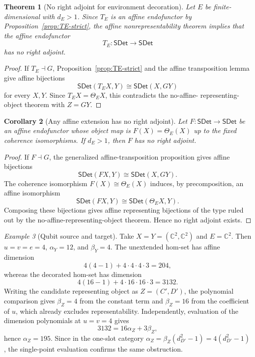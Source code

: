 \documentclass[11pt,a4paper]{article}
\theoremstyle{definition}
\theoremstyle{plain}
\newtheorem{theorem}{Theorem}[section]
\newtheorem{corollary}[theorem]{Corollary}
\theoremstyle{remark}
\newtheorem{example}[theorem]{Example}
\newcommand{\SDet}{\mathsf{SDet}}
\begin{document}
\begin{theorem}[No right adjoint for environment decoration]
Let $E$ be finite-dimensional with $d_E>1$. Since $T_E$ is an affine endofunctor by Proposition~\ref{prop:TE-strict}, the affine nonrepresentability theorem implies that the affine endofunctor
\[
T_E:\SDet\to\SDet
\]
has no right adjoint.
\end{theorem}
\begin{proof}
If $T_E\dashv G$, Proposition~\ref{prop:TE-strict} and the affine
transposition lemma give affine bijections
\[
\SDet(T_EX,Y)\cong\SDet(X,GY)
\]
for every $X,Y$. Since $T_EX=\Theta_E X$, this contradicts the no-affine-
representing-object theorem with $Z=GY$.
\end{proof}

\begin{corollary}[Any affine extension has no right adjoint]
Let $F:\SDet\to\SDet$ be an affine endofunctor whose object map is
$F(X)=\Theta_E(X)$ up to the fixed coherence isomorphisms. If $d_E>1$,
then $F$ has no right adjoint.
\end{corollary}
\begin{proof}
If $F\dashv G$, the generalized affine-transposition proposition gives
affine bijections
\[
\SDet(FX,Y)\cong\SDet(X,GY).
\]
The coherence isomorphism $F(X)\cong\Theta_E(X)$ induces, by precomposition,
an affine isomorphism
\[
\SDet(FX,Y)\cong\SDet(\Theta_E X,Y).
\]
Composing these bijections gives affine representing bijections of the
type ruled out by the no-affine-representing-object theorem. Hence no
right adjoint exists.
\end{proof}

\begin{example}[Qubit source and target]
Take $X=Y=(\mathbb C^2,\mathbb C^2)$ and $E=\mathbb C^2$. Then
$u=v=e=4$, $\alpha_Y=12$, and $\beta_Y=4$. The unextended hom-set
has affine dimension
\[
4(4-1)+4\cdot4\cdot4\cdot3=204,
\]
whereas the decorated hom-set has dimension
\[
4(16-1)+4\cdot16\cdot16\cdot3=3132.
\]
Writing the candidate representing object as $Z=(C',D')$, the
polynomial comparison gives $\beta_Z=4$ from the constant term and
$\beta_Z=16$ from the coefficient of $u$, which already excludes
representability. Independently, evaluation of the dimension polynomials
at $u=v=4$ gives
\[
3132=16\alpha_Z+3\beta_Z,
\]
hence $\alpha_Z=195$. Since in the one-slot category
$\alpha_Z=\beta_Z(d_{D'}^2-1)=4(d_{D'}^2-1)$, the single-point evaluation
confirms the same obstruction.
\end{example}
\end{document}
